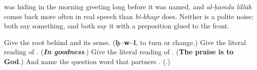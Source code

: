 \textbf{} was hiding in the morning greeting long before it was named, and \emph{al-ḥamdu lillāh} comes back more often in real speech than \emph{bi-khayr} does. Neither is a polite noise: both say something, and both say it with a preposition glued to the front.

\begin{tcolorbox}[breakable,colback=teal!4,colframe=teal!35!black,title={Before you move on}]
Give the root behind \textbf{} and its sense. (\textbf{ḥ–w–l}, to turn or change.) Give the literal reading of \textbf{}. (\emph{\textbf{In goodness}}.) Give the literal reading of \textbf{ }. (\textbf{The praise is to God}.) And name the question word that partners \textbf{}. (\textbf{}.)
\end{tcolorbox}
